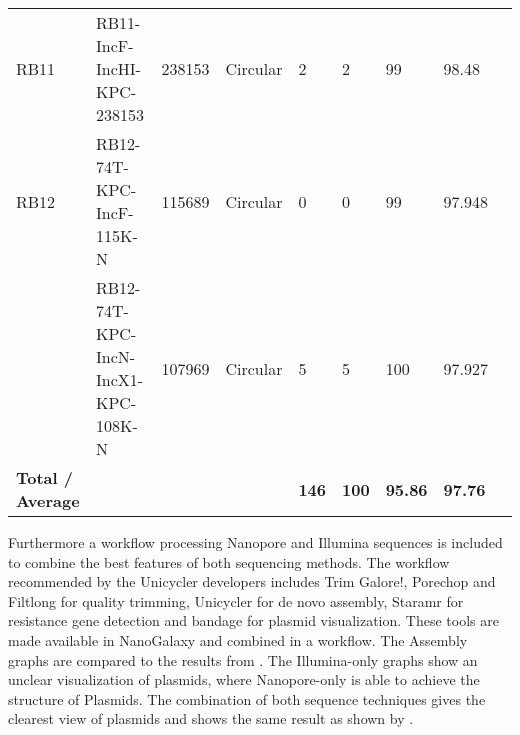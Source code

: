 \documentclass[a4paper,num-refs]{oup-contemporary}
\begin{document}
\begin{landscape}
\begin{table}
\begin{tabularx}{\linewidth}{l l l l l l l l l}
RB11                     & RB11-IncF-IncHI-KPC-238153         & 238153        & Circular            & 2                                & 2                                        & 99                & 98.48             &                   \\
RB12                     & RB12-74T-KPC-IncF-115K-N           & 115689        & Circular            & 0                                & 0                                        & 99                & 97.948            &                   \\
                         & RB12-74T-KPC-IncN-IncX1-KPC-108K-N & 107969        & Circular            & 5                                & 5                                        & 100               & 97.927            &                   \\
\midrule
\textbf{Total / Average} & \textbf{}                          & \textbf{}     & \textbf{}           & \textbf{146}                     & \textbf{100}                             & \textbf{95.86}    & \textbf{97.76}    & \textbf{}        \\
\bottomrule
\end{tabularx}
\end{table}
\end{landscape}


Furthermore a workflow processing Nanopore and Illumina sequences is included to combine the best features of both sequencing methods. The workflow recommended by the Unicycler developers \cite{Wick2017} includes Trim Galore!,
Porechop and Filtlong for quality trimming, Unicycler for de novo assembly, Staramr for resistance gene detection and bandage for plasmid visualization. These tools are made available in NanoGalaxy and combined in a workflow. The Assembly graphs are compared to the results from \citet{Wick2017}. The Illumina-only graphs show an unclear visualization of plasmids, where Nanopore-only is able to achieve the structure of Plasmids. The combination of both sequence techniques gives the clearest view of plasmids and shows the same result as shown by \citet{Wick2017}.
\end{document}
